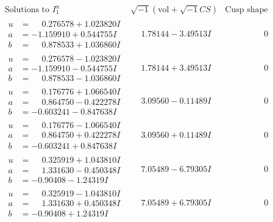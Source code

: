 \documentclass[1p]{elsarticle_modified}
\theoremstyle{definition}
\newcommand{\I}{\sqrt{-1}}
\begin{document}
$$\begin{array}{c|c|c}  
\text{Solutions to }I^u_{1}& \I (\text{vol} + \sqrt{-1}CS) & \text{Cusp shape}\\
 \hline 
\begin{aligned}
u &= \phantom{-}0.276578 + 1.023820 I \\
a &= -1.159910 + 0.544755 I \\
b &= \phantom{-}0.878533 + 1.036860 I\end{aligned}
 & \phantom{-}1.78144 - 3.49513 I & \phantom{-0.000000 } 0 \\ \hline\begin{aligned}
u &= \phantom{-}0.276578 - 1.023820 I \\
a &= -1.159910 - 0.544755 I \\
b &= \phantom{-}0.878533 - 1.036860 I\end{aligned}
 & \phantom{-}1.78144 + 3.49513 I & \phantom{-0.000000 } 0 \\ \hline\begin{aligned}
u &= \phantom{-}0.176776 + 1.066540 I \\
a &= \phantom{-}0.864750 - 0.422278 I \\
b &= -0.603241 - 0.847638 I\end{aligned}
 & \phantom{-}3.09560 - 0.11489 I & \phantom{-0.000000 } 0 \\ \hline\begin{aligned}
u &= \phantom{-}0.176776 - 1.066540 I \\
a &= \phantom{-}0.864750 + 0.422278 I \\
b &= -0.603241 + 0.847638 I\end{aligned}
 & \phantom{-}3.09560 + 0.11489 I & \phantom{-0.000000 } 0 \\ \hline\begin{aligned}
u &= \phantom{-}0.325919 + 1.043810 I \\
a &= \phantom{-}1.331630 - 0.450348 I \\
b &= -0.90408 - 1.24319 I\end{aligned}
 & \phantom{-}7.05489 - 6.79305 I & \phantom{-0.000000 } 0 \\ \hline\begin{aligned}
u &= \phantom{-}0.325919 - 1.043810 I \\
a &= \phantom{-}1.331630 + 0.450348 I \\
b &= -0.90408 + 1.24319 I\end{aligned}
 & \phantom{-}7.05489 + 6.79305 I & \phantom{-0.000000 } 0 \\ \hline\begin{aligned}

\end{aligned}
\end{array}$$
\end{document}
